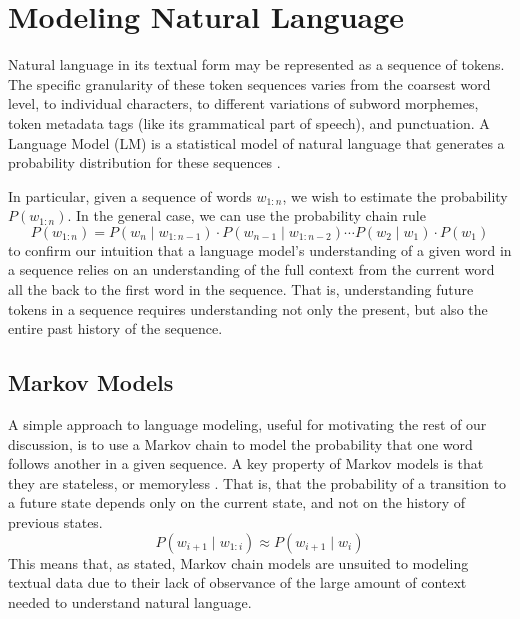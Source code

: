 \section{Modeling Natural Language}\label{sec:introduction:language-models}

Natural language in its textual form may be represented as a sequence of tokens.
The specific granularity of these token sequences varies from the coarsest word level, to individual characters, to different variations of subword morphemes, token metadata tags (like its grammatical part of speech), and punctuation.
A Language Model (LM) is a statistical model of natural language that generates a probability distribution for these sequences \cite{pappas_meyer_2012,goldberg_2017}.

In particular, given a sequence of words $w_{1:n}$, we wish to estimate the probability $P(w_{1:n})$. In the general case, we can use the probability chain rule
\begin{equation}
    P(w_{1:n}) = P(w_n \mid w_{1:n - 1}) \cdot P(w_{n - 1} \mid w_{1:n - 2}) \cdots P(w_2 \mid w_1) \cdot P(w_1)\label{eq:language-models:chain-rule}
\end{equation}
to confirm our intuition that a language model's understanding of a given word in a sequence relies on an understanding of the full context from the current word all the back to the first word in the sequence.
That is, understanding future tokens in a sequence requires understanding not only the present, but also the entire past history of the sequence.

\subsection{Markov Models}\label{sec:language-models:markov}

A simple approach to language modeling, useful for motivating the rest of our discussion, is to use a Markov chain to model the probability that one word follows another in a given sequence.
A key property of Markov models is that they are stateless, or memoryless \cite{gagniuc_2017}.
That is, that the probability of a transition to a future state depends only on the current state, and not on the history of previous states.
\begin{equation}
    P(w_{i + 1} \mid w_{1:i}) \approx P(w_{i+1} \mid w_i) \label{eq:language-models:markov-chain}
\end{equation}
This means that, as stated, Markov chain models are unsuited to modeling textual data due to their lack of observance of the large amount of context needed to understand natural language.

